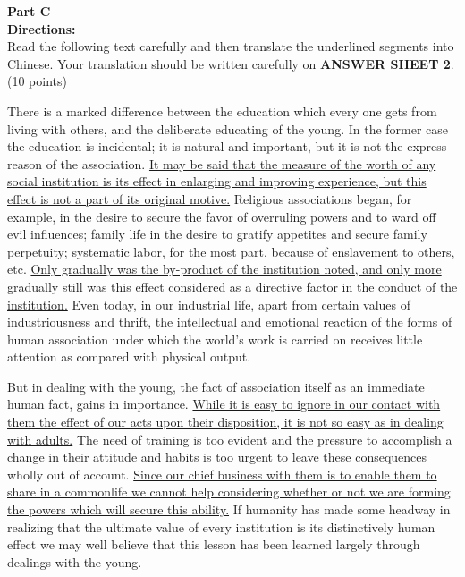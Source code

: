 \newpage

\noindent
\textbf{Part C}\\
\textbf{Directions:}\\
Read the following text carefully and then translate the underlined
segments into Chinese. Your translation should be written carefully on
\textbf{ANSWER SHEET 2}. (10 points)



\TiGanSpace


There is a marked difference between the education which every one gets
from living with others, and the deliberate educating of the young. In
the former case the education is incidental; it is natural and
important, but it is not the express reason of the association.
\transnum \uline{It may be said that the measure of the worth of any
social institution is its effect in enlarging and improving experience,
but this effect is not a part of its original motive.} Religious
associations began, for example, in the desire to secure the favor of
overruling powers and to ward off evil influences; family life in the
desire to gratify appetites and secure family perpetuity; systematic
labor, for the most part, because of enslavement to others, etc.
\transnum \uline{Only gradually was the by-product of the institution
noted, and only more gradually still was this effect considered as a
directive factor in the conduct of the institution.} Even today, in our
industrial life, apart from certain values of industriousness and
thrift, the intellectual and emotional reaction of the forms of human
association under which the world's work is carried on receives little
attention as compared with physical output.

But in dealing with the young, the fact of association itself as an
immediate human fact, gains in importance. \transnum \uline{While it is
easy to ignore in our contact with them the effect of our acts upon
their disposition, it is not so easy as in dealing with adults.} The
need of training is too evident and the pressure to accomplish a change
in their attitude and habits is too urgent to leave these consequences
wholly out of account. \transnum \uline{Since our chief business with them
is to enable them to share in a commonlife we cannot help considering
whether or not we are forming the powers which will secure this
ability.} If humanity has made some headway in realizing that the
ultimate value of every institution is its distinctively human effect we
may well believe that this lesson has been learned largely through
dealings with the young.

